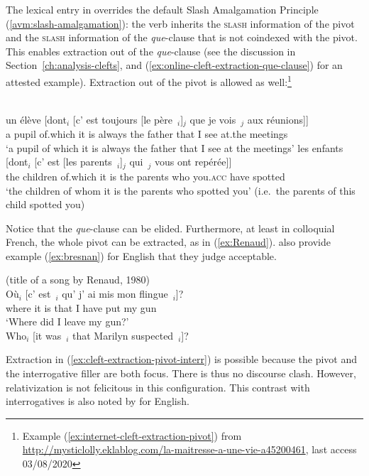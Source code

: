 The lexical entry in  overrides the default Slash Amalgamation Principle (\ref{avm:slash-amalgamation}): the verb inherits the \textsc{slash} information of the pivot and the \textsc{slash} information of the \emph{que}-clause that is not coindexed with the pivot. This enables extraction out of the \emph{que}-clause (see the discussion in Section~\ref{ch:analysis-clefts}, and (\ref{ex:online-cleft-extraction-que-clause}) for an attested example).
Extraction out of the pivot is allowed as well:\footnote{Example (\ref{ex:internet-cleft-extraction-pivot}) from \url{http://mysticlolly.eklablog.com/la-maitresse-a-une-vie-a45200461}, last access 03/08/2020}

\eal 
\ex \citep{Winckel.2020}\\
\gll un élève [dont$_i$ [c' est toujours [le père~\trace{}$_i$]$_j$ que je vois~\trace{}$_j$ aux réunions]]\\
a pupil \sbar{}of.which \sbar{}it is always \sbar{}the father that I see at.the meetings\\
\glt `a pupil of which it is always the father that I see at the meetings'
\ex \gll les enfants [dont$_i$ [c' est [les parents~\trace{}$_i$]$_j$ qui~\trace{}$_j$ vous ont repérée]]\\
the children \sbar{}of.which \sbar{}it is \sbar{}the parents who you\textsc{.acc} have spotted\\
\glt `the children of whom it is the parents who spotted you' (i.e.\ the parents of this child spotted you)
\label{ex:internet-cleft-extraction-pivot}
\zl 

Notice that the \emph{que}-clause can be elided. Furthermore, at least in colloquial French, the whole pivot can be extracted, as in (\ref{ex:Renaud}). \citet{Bresnan.1987} also provide example (\ref{ex:bresnan}) for English that they judge acceptable.

\eal \label{ex:cleft-extraction-pivot-interr}
\ex (title of a song by Renaud, 1980)\\
\gll Où$_i$ [c' est~\trace{}$_i$ qu' j' ai mis mon flingue~\trace{}$_i$]?\\
where \sbar{}it is that I have put my gun\\
\glt `Where did I leave my gun?'
\label{ex:Renaud}
\ex \citep[759]{Bresnan.1987}\\
Who$_i$ [it was~\trace{}$_i$ that Marilyn suspected~\trace{}$_i$]?
\label{ex:bresnan}
\zl 

Extraction in (\ref{ex:cleft-extraction-pivot-interr}) is possible because the pivot and the interrogative filler are both focus. There is thus no discourse clash. However, relativization is not felicitous in this configuration. This contrast with interrogatives is also noted by \citet[759]{Bresnan.1987} for English.

